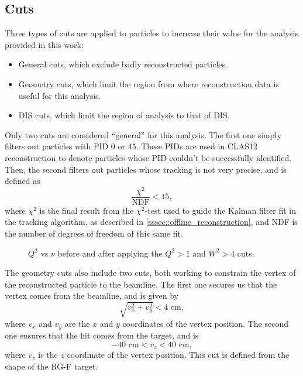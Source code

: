 \subsection{Cuts}
\label{ssec::cuts}
    Three types of cuts are applied to particles to increase their value for the analysis provided in this work:
    \begin{itemize}
        \item
            General cuts, which exclude badly reconstructed particles.
        \item
            Geometry cuts, which limit the region from where reconstruction data is useful for this analysis.
        \item
            DIS cuts, which limit the region of analysis to that of DIS.
    \end{itemize}

    Only two cuts are considered ``general'' for this analysis.
    The first one simply filters out particles with PID $0$ or $45$.
    These PIDs are used in CLAS12 reconstruction to denote particles whose PID couldn't be successfully identified.
    Then, the second filters out particles whose tracking is not very precise, and is defined as
    \begin{equation*}
        \frac{\chi^2}{\text{NDF}} < 15,
    \end{equation*}
    where $\chi^2$ is the final result from the $\chi^2$-test used to guide the Kalman filter fit in the tracking algorithm, as described in \ref{sssec::offline_reconstruction}, and NDF is the number of degrees of freedom of this same fit.

    \begin{figure}[b!]
        \centering{}
        \caption[$Q^2$ vs $\nu$ comparison]{$Q^2$ vs $\nu$ before and after applying the $Q^2 > 1$ and $W^2 > 4$ cuts.}
        \label{fig::q2vsnu}
    \end{figure}

    The geometry cuts also include two cuts, both working to constrain the vertex of the reconstructed particle to the beamline.
    The first one secures us that the vertex comes from the beamline, and is given by
    \begin{equation*}
        \sqrt{v_x^2 + v_y^2} < 4 \text{ cm},
    \end{equation*}
    where $v_x$ and $v_y$ are the $x$ and $y$ coordinates of the vertex position.
    The second one ensures that the hit comes from the target, and is
    \begin{equation*}
        -40 \text{ cm} < v_z < 40 \text{ cm},
    \end{equation*}
    where $v_z$ is the $z$ coordinate of the vertex position.
    This cut is defined from the shape of the RG-F target.

